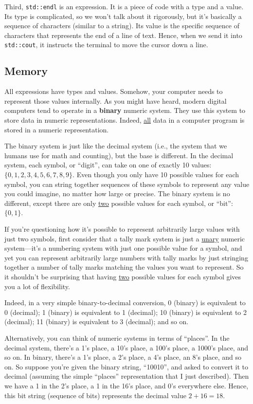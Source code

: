 \documentclass{article}
\begin{document}
Third, \texttt{std::endl} is an expression. It is a piece of code with a type and a value. Its type is complicated, so we won't talk about it rigorously, but it's basically a sequence of characters (similar to a string). Its value is the specific sequence of characters that represents the end of a line of text. Hence, when we send it into \texttt{std::cout}, it instructs the terminal to move the cursor down a line.

\subsection{Memory}

All expressions have types and values. Somehow, your computer needs to represent those values internally. As you might have heard, modern digital computers tend to operate in a \textbf{binary} numeric system. They use this system to store data in numeric representations. Indeed, \ul{all} data in a computer program is stored in a numeric representation.

The binary system is just like the decimal system (i.e., the system that we humans use for math and counting), but the base is different. In the decimal system, each symbol, or ``digit'', can take on one of exactly 10 values: $\{0, 1, 2, 3, 4, 5, 6, 7, 8, 9\}$. Even though you only have 10 possible values for each symbol, you can string together sequences of these symbols to represent any value you could imagine, no matter how large or precise. The binary system is no different, except there are only \ul{two} possible values for each symbol, or ``bit'': $\{0, 1\}$.

If you're questioning how it's possible to represent arbitrarily large values with just two symbols, first consider that a tally mark system is just a \ul{unary} numeric system---it's a numbering system with just one possible value for a symbol, and yet you can represent arbitrarily large numbers with tally marks by just stringing together a number of tally marks matching the values you want to represent. So it shouldn't be surprising that having \ul{two} possible values for each symbol gives you a lot of flexibility.

Indeed, in a very simple binary-to-decimal conversion, 0 (binary) is equivalent to 0 (decimal); 1 (binary) is equivalent to 1 (decimal); 10 (binary) is equivalent to 2 (decimal); 11 (binary) is equivalent to 3 (decimal); and so on.

Alternatively, you can think of numeric systems in terms of ``places''. In the decimal system, there's a 1's place, a 10's place, a 100's place, a 1000's place, and so on. In binary, there's a 1's place, a 2's place, a 4's place, an 8's place, and so on. So suppose you're given the binary string, ``10010'', and asked to convert it to decimal (assuming the simple ``places'' representation that I just described). Then we have a 1 in the 2's place, a 1 in the 16's place, and 0's everywhere else. Hence, this bit string (sequence of bits) represents the decimal value $2 + 16 = 18$.
\end{document}
